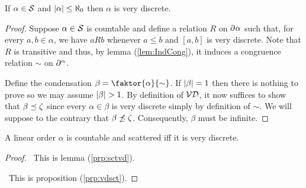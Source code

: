     \begin{lem}\label{prp:sctvd}
        If $\alpha\in\mathcal{S}$ and $\left\lvert\alpha\right\rvert\leq\aleph_0$ then $\alpha$ is very discrete.
    \end{lem}

\begin{proof}
    Suppose $\alpha\in\mathcal{S}$ is countable and define a relation $R$ on $\partial^{}\alpha$ such that, for every $a,b\in\alpha$, we have $aRb$ whenever $a\leq b$ and $[a,b]$ is very discrete.  Note that $R$ is transitive and thus, by lemma (\ref{lem:IndCong}), it induces a congruence relation $\sim$ on $\partial^{\alpha}$.

        Define the condensation $\beta=\faktor{\alpha}{\sim}$.  If $\left\lvert\beta\right\rvert=1$ then there is nothing to prove so we may assume $\left\lvert\beta\right\rvert>1$.  By definition of $\mathcal{VD}$, it now suffices to show that $\beta\preceq\zeta$ since every $\alpha\in\beta$ is very discrete simply by definition of $\sim$.  We will suppose to the contrary that $\beta\not\preceq\zeta$.  Consequently, $\beta$ must be infinite.
\end{proof}

    	\iffalse\begin{prp}\label{prp:splitfix}
		Suppose $\Lambda$ is the lattice of condensations of the linear order $\alpha$.  Define $S$ to be the functor that takes each factor map $f\colon\alpha\to\beta$ to the splitting $S(f)\colon\alpha\to\faktor{\alpha}{\sim_\beta}$, for some congruence $\sim_\beta$ on $\alpha$, such that the unique isomorphism $\iota_\beta\colon\faktor{\alpha}{\sim_\beta}\to\beta$ makes the diagram
		\begin{equation}
			\begin{tikzcd}
				\alpha\arrow[rr,"S(f)"]&&\faktor{\alpha}{\sim_\beta}\arrow[dd,"\iota_\beta",dashrightarrow]\\
				\\
						       &&\beta\arrow[from=lluu,"f"]
			\end{tikzcd}
		\end{equation}
		commute.  If $\beta\in\Lambda$ is a minimal fixed point of $S^\prime=S\fsplit[-]$, and $\beta$ is not trivially dense then $\beta\in\Dense$.
		\begin{enumerate}
			.
		\end{enumerate}
	\end{prp}\fi

\begin{thm}
	A linear order $\alpha$ is countable and  scattered iff it is very discrete.
\end{thm}
\begin{proof}

	\forward\	This is lemma (\ref{prp:sctvd}).

	\backward\	This is proposition (\ref{prp:vdsct}).
\end{proof}


